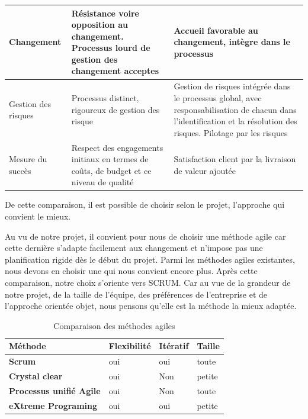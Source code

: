 \begin{table}[H]
\begin{tabular}{|l|p{5cm}|p{6cm}|}
		Changement          & Résistance voire opposition au changement. Processus lourd de gestion des changement acceptes          & Accueil favorable au changement, intègre dans le processus                                                                                                           \\ \hline
		Gestion des risques & Processus distinct, rigoureux de gestion des risque                                                    & Gestion de risques intégrée dans le processus global, avec responsabilisation de chacun dans l’identification et la résolution des risques. Pilotage par les risques \\ \hline
		Mesure du succès    & Respect des engagements initiaux en termes de coûts, de budget et ce niveau de qualité                 & Satisfaction client par la livraison de valeur ajoutée                                                                                                               \\ \hline
	\end{tabular}
\end{table}

De cette comparaison, il est possible de choisir selon le projet, l’approche qui convient le
mieux.

Au vu de notre projet, il convient pour nous de choisir une méthode agile car cette dernière
s’adapte facilement aux changement et n’impose pas une planification rigide dès le début du
projet. Parmi les méthodes agiles existantes, nous devons en choisir une qui nous convient
encore plus. Après cette comparaison, notre choix s’oriente vers SCRUM. Car au vue de la grandeur de notre projet, de la taille de l’équipe, des préférences de l’entreprise
et de l’approche orientée objet, nous pensons qu’elle est la méthode la mieux adaptée.

\begin{table}[H]
	\centering
	\caption{Comparaison des méthodes agiles}
	\label{tab:my-table}
	\begin{tabular}{|l|l|l|l|}
		\hline
		\textbf{Méthode}                & \textbf{Flexibilité} & \textbf{Itératif} & \textbf{Taille} \\ \hline
		\textbf{Scrum}                  & oui                  & oui               & toute           \\ \hline
		\textbf{Crystal clear}          & oui                  & Non               & petite          \\ \hline
		\textbf{Processus unifié Agile} & oui                  & Non               & toute           \\ \hline
		\textbf{eXtreme Programing}     & oui                  & oui               & petite          \\ \hline
	\end{tabular}
\end{table}

